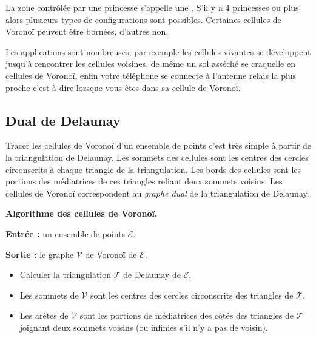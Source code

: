 \documentclass[11pt,class=report,crop=false]{standalone}
\begin{document}

La zone contrôlée par une princesse s'appelle une .
S'il y a $4$ princesses ou plus alors plusieurs types de configurations sont possibles. Certaines cellules de Voronoï peuvent être bornées, d'autres non.




Les applications sont nombreuses, par exemple les cellules vivantes se développent jusqu'à rencontrer les cellules voisines, de même un sol asséché se craquelle en cellules de Voronoï,
enfin votre téléphone se connecte à l'antenne relais la plus proche c'est-à-dire lorsque vous êtes dans sa cellule de Voronoï.


\subsection{Dual de Delaunay}

Tracer les cellules de Voronoï d'un ensemble de points c'est très simple à partir de la triangulation de Delaunay. Les sommets des cellules sont les centres des cercles circonscrits à chaque triangle de la triangulation. Les bords des cellules sont les portions des médiatrices de ces triangles reliant deux sommets voisins.
Les cellules de Voronoï correspondent au \emph{graphe dual} de la triangulation de Delaunay.

\begin{algorithme}
\textbf{Algorithme des cellules de Voronoï.}

\textbf{Entrée :} un ensemble de points $\mathcal{E}$.

\textbf{Sortie :} le graphe $\mathcal{V}$ de Voronoï de $\mathcal{E}$.

\begin{itemize}
	\item Calculer la triangulation $\mathcal{T}$ de Delaunay de $\mathcal{E}$.
	\item Les sommets de $\mathcal{V}$ sont les centres des cercles circonscrits des triangles de $\mathcal{T}$.
	\item Les arêtes de $\mathcal{V}$ sont les portions de médiatrices des côtés des triangles de $\mathcal{T}$ joignant deux sommets voisins (ou infinies s'il n'y a pas de voisin).
\end{itemize}	
\end{algorithme}
	
\end{document}
